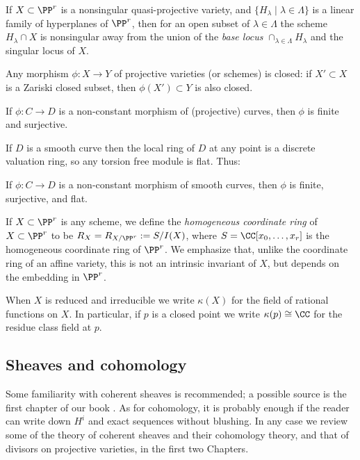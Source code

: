 \begin{theorem}\label{Bertini}
If $X\subset \PP^r$  is a nonsingular quasi-projective variety, and $\{H_\lambda \mid \lambda\in \Lambda\}$ is a linear family of hyperplanes of $\PP^r$, then for an open subset of $\lambda\in \Lambda$ the scheme $H_\lambda \cap X$ is nonsingular away from the union of the \emph{base locus}
$
\cap_{\lambda \in \Lambda} H_\lambda
$
and the singular locus of $X$.
\end{theorem}

\begin{theorem}
 Any morphism $\phi: X\to Y$ of projective varieties (or schemes) is closed: if $X'\subset X$ is a Zariski closed subset,
 then $\phi(X') \subset Y$ is also closed.
\end{theorem}

\begin{corollary}
If $\phi: C\to D$ is a non-constant morphism of (projective) curves, then $\phi$ is finite and surjective. 
\end{corollary}

If $D$ is a 
smooth curve then the local ring of $D$ at any point is a discrete valuation ring, so any torsion free module is flat. 
Thus:

\begin{proposition}
If $\phi: C\to D$ is a non-constant morphism of smooth curves, then $\phi$ is finite, surjective, and flat.
\end{proposition}

If $X\subset \PP^{r}$ is any scheme, we define the \emph{homogeneous coordinate ring} of $X\subset \PP^{r}$
to be $R_{X} = R_{X/\PP^{r}}:= S/I(X)$, where $S =\CC[x_{0}, \dots, x_{r}]$ is the homogeneous coordinate ring of $\PP^{r}$. We emphasize
that, unlike the coordinate ring of an affine variety, this is not an intrinsic invariant of $X$, but depends on the 
embedding in $\PP^{r}$. 

When $X$ is reduced and irreducible we write $\kappa(X)$ for the field of rational functions on $X$. In particular, if
$p$ is a closed point  we write $\kappa(p)\cong \CC$ for the residue class field at $p$.

\subsection {Sheaves and cohomology} 

Some familiarity with coherent sheaves is recommended; a possible source is
the first chapter of our book \cite{GeomSchemes}. 
As for cohomology, it is probably enough if the reader can write down $H^i$ and exact sequences without blushing.
In any case we review some of the theory of coherent sheaves and their cohomology theory, and that of divisors on projective 
varieties, in the first two Chapters. 

